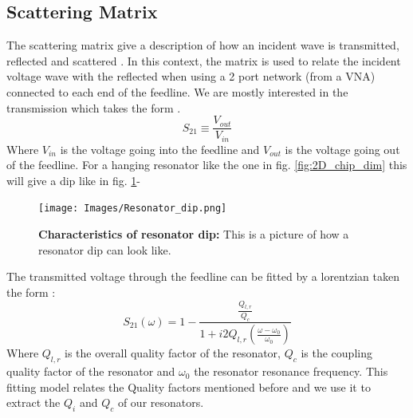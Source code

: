     \subsection{Scattering Matrix}
        The scattering matrix give a description of how an incident wave is transmitted, reflected and scattered \cite{Pozar2012}. In this context, the matrix is used to relate the incident voltage wave with the reflected when using a 2 port network (from a VNA) connected to each end of the feedline. We are mostly interested in the transmission which takes the form \cite{Khalil2012}.  
        \begin{equation}
            S_{21} \equiv \frac{V_{out}}{V_{in}}
        \end{equation}
        Where $V_{in}$ is the voltage going into the feedline and $V_{out}$ is the voltage going out of the feedline. For a hanging resonator like the one in fig. \ref{fig:2D_chip_dim} this will give a dip like in fig. \ref{fig:resonator_dip}- 
        \begin{figure}[h]
            \centering
            \texttt{[image: Images/Resonator\_dip.png]}
            \caption[Characteristics of resonator dip]{\textbf{Characteristics of resonator dip:} This is a picture of how a resonator dip can look like.}
        \label{fig:resonator_dip}
        \end{figure}
        The transmitted voltage through the feedline can be fitted by a lorentzian taken the form \cite{Zmuidzinas2012}:
        \begin{equation}
            S_{21}(\omega) = 1 - \frac{\frac{Q_{l,r}}{Q_c}}{1+i2Q_{l,r}(\frac{\omega-\omega_0}{\omega_0})}
        \end{equation}
        Where $Q_{l,r}$ is the overall quality factor of the resonator, $Q_c$ is the coupling quality factor of the resonator and $\omega_0$ the resonator resonance frequency. This fitting model relates the Quality factors mentioned before and we use it to extract the $Q_i$ and $Q_c$ of our resonators. 
